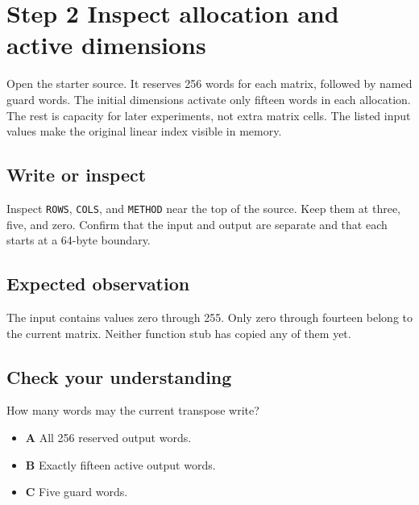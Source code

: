 \section{Step 2 Inspect allocation and active dimensions}\label{transpose-s02}

Open the starter source. It reserves 256 words for each matrix, followed by named guard words. The initial dimensions activate only fifteen words in each allocation. The rest is capacity for later experiments, not extra matrix cells. The listed input values make the original linear index visible in memory.

\subsection{Write or inspect}
Inspect \texttt{ROWS}, \texttt{COLS}, and \texttt{METHOD} near the top of the source. Keep them at three, five, and zero. Confirm that the input and output are separate and that each starts at a 64-byte boundary.

\subsection{Expected observation}
The input contains values zero through 255. Only zero through fourteen belong to the current matrix. Neither function stub has copied any of them yet.

\subsection{Check your understanding}
How many words may the current transpose write?

\begin{itemize}
  \item \textbf{A} All 256 reserved output words.
  \item \textbf{B} Exactly fifteen active output words.
  \item \textbf{C} Five guard words.
\end{itemize}
